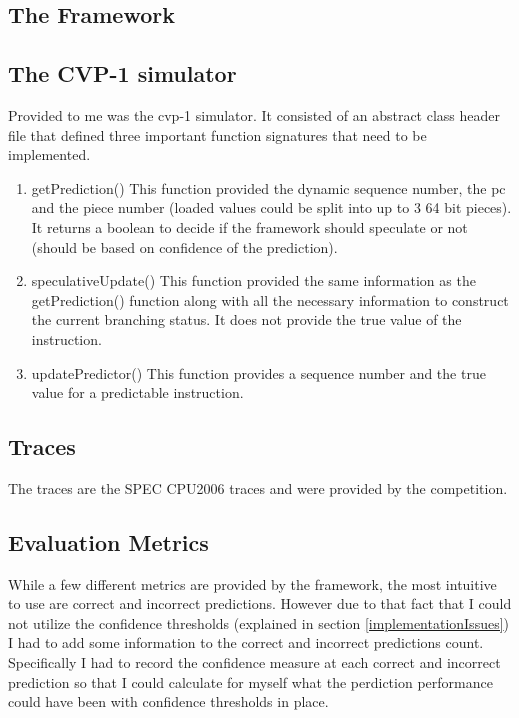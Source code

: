 \documentclass[12pt]{article}
\newcommand\tab[1][1cm]{\hspace*{#1}}
\begin{document}
\begin{multicols}{2}
\section{The Framework}
\subsection{The CVP-1 simulator}
\tab Provided to me was the cvp-1 simulator. It consisted of an abstract class header file that defined three important function signatures that need to be implemented.
\begin{enumerate}[label=Function \arabic*,leftmargin=*, align=left]
\item getPrediction() This function provided the dynamic sequence number, the pc and the piece number (loaded values could be split into up to 3 64 bit pieces). It returns a boolean to decide if the framework should speculate or not (should be based on confidence of the prediction).
\item speculativeUpdate() This function provided the same information as the getPrediction() function along with all the necessary information to construct the current branching status. It does not provide the true value of the instruction.
\item updatePredictor() This function provides a sequence number and the true value for a predictable instruction.
\end{enumerate}
\subsection{Traces}
\tab The traces are the SPEC CPU2006 traces and were provided by the competition.
\subsection{Evaluation Metrics}
\tab While a few different metrics are provided by the framework, the most intuitive to use are correct and incorrect predictions. However due to that fact that I could not utilize the confidence thresholds (explained in section \ref{implementationIssues}) I had to add some information to the correct and incorrect predictions count. Specifically I had to record the confidence measure at each correct and incorrect prediction so that I could calculate for myself what the perdiction performance could have been with confidence thresholds in place.

\end{multicols}
\end{document}
